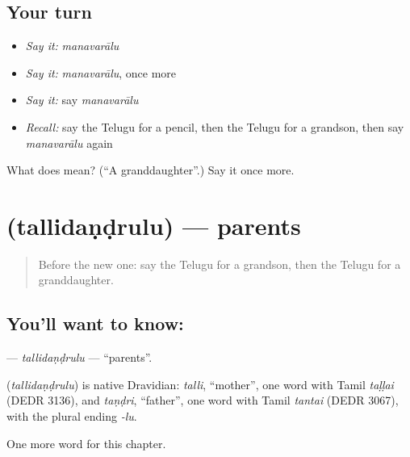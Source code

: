 \subsection*{Your turn}
\begin{itemize}
\raggedright
  \item \emph{Say it:} \emph{manavarālu}
  \item \emph{Say it:} \emph{manavarālu}, once more
  \item \emph{Say it:} say \emph{manavarālu}
  \item \emph{Recall:} say the Telugu for a pencil, then the Telugu for a grandson, then say \emph{manavarālu} again
\end{itemize}

\begin{tcolorbox}[breakable,colback=teal!4,colframe=teal!35!black,title={Before you move on}]
What does  mean? (\textquotedblleft{}A granddaughter\textquotedblright{}.) Say it once more.
\end{tcolorbox}
\section[\texorpdfstring{\te{తల్లిదండ్రులు} (tallidaṇḍrulu)}{తల్లిదండ్రులు (tallidaṇḍrulu)}]{ (tallidaṇḍrulu) — parents}

\label{lesson:TE-C186-tallidandrulu}



\begin{quote}
Before the new one: say the Telugu for a grandson, then the Telugu for a granddaughter.
\end{quote}

\subsection*{You'll want to know: }
\textbf{} — \emph{tallidaṇḍrulu} — \textquotedblleft{}parents\textquotedblright{}.

\begin{cousinweb}
\textbf{} (\emph{tallidaṇḍrulu}) is native Dravidian: \emph{talli}, \textquotedblleft{}mother\textquotedblright{}, one word with Tamil \emph{taḷḷai} (DEDR 3136), and \emph{taṇḍri}, \textquotedblleft{}father\textquotedblright{}, one word with Tamil \emph{tantai} (DEDR 3067), with the plural ending \emph{-lu}.
\end{cousinweb}

\begin{grammarlens}[title={What you've built}]
One more word for this chapter.
\end{grammarlens}

